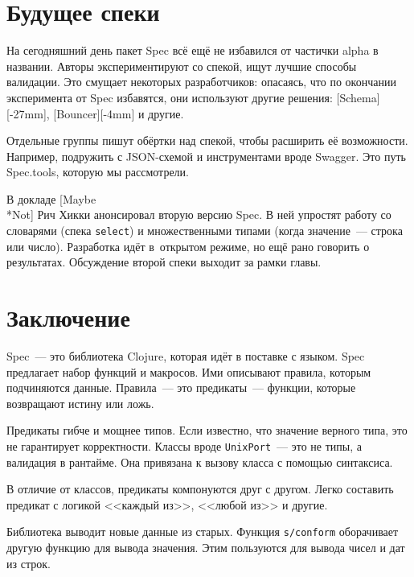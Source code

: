 \section{Будущее спеки}


На сегодняшний день пакет Spec всё ещё не избавился от частички
alpha в названии. Авторы экспериментируют со спекой, ищут лучшие способы
валидации. Это смущает некоторых разработчиков: опасаясь, что по окончании
эксперимента от Spec избавятся, они используют другие решения:
[Schema][-27mm],
[Bouncer][-4mm] и другие.

Отдельные группы пишут обёртки над спекой, чтобы расширить её
возможности. Например, подружить с JSON-схемой и инструментами вроде
Swagger. Это путь Spec.tools, которую мы рассмотрели.


В докладе [Maybe\\*Not] Рич
Хикки анонсировал вторую версию Spec. В ней упростят работу со словарями (спека
\verb|select|) и множественными типами (когда значение~--- строка или
число). Разработка идёт в~открытом режиме, но ещё рано говорить о
результатах. Обсуждение второй спеки выходит за рамки главы.

\section{Заключение}

Spec~--- это библиотека Clojure, которая идёт в поставке с языком. Spec предлагает
набор функций и макросов. Ими описывают правила, которым подчиняются
данные. Правила~--- это предикаты~--- функции, которые возвращают истину или ложь.

Предикаты гибче и мощнее типов. Если известно, что значение верного типа, это не
гарантирует корректности. Классы вроде \verb|UnixPort|~--- это не типы, а
валидация в рантайме. Она привязана к вызову класса с помощью синтаксиса.

В отличие от классов, предикаты компонуются друг с другом. Легко составить
предикат с логикой <<каждый из>>, <<любой из>> и другие.

Библиотека выводит новые данные из старых. Функция \verb|s/conform|
оборачивает другую функцию для вывода значения. Этим пользуются для вывода чисел
и дат из строк.

